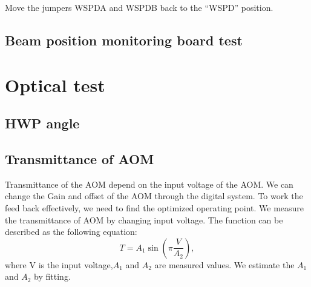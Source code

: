 \begin{enumerate}
\begin{enumerate}
		\begin{center}
		\end{center}
		Move the jumpers WSPDA and WSPDB back to the “WSPD” position.
	\end{enumerate}
\end{enumerate}

\subsection{Beam position monitoring board test}

\section{Optical test}
\subsection{HWP angle}
\subsection{Transmittance of AOM}
Transmittance of the AOM depend on the input voltage of the AOM. We can change the Gain and offset of the AOM through the digital system. To work the feed back effectively, we need to find the optimized operating point. We measure the transmittance of AOM by changing input voltage. The function can be described as the following equation:
\begin{equation}
T=A_1 \sin{\left( \pi \frac{V}{A_2}\right)},
\end{equation}
where V is the input voltage,$ A_1$ and $A_2$ are measured values. We estimate the $A_1$ and $A_2$ by fitting.
			\begin{center}
                                                   \end{center}

